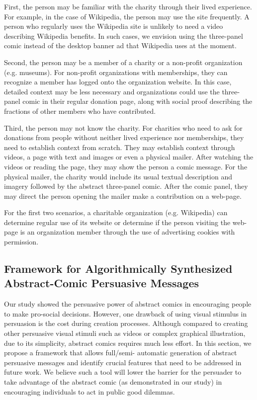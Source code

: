 \begin{description} [leftmargin=\parindent,topsep=0pt,partopsep=3pt,parsep=0pt,itemsep=3pt, listparindent=\parindent]
    First, the person may be familiar with the charity through their lived experience. For example, in the case of Wikipedia, the person may use the site frequently. A person who regularly uses the Wikipedia site is unlikely to need a video describing Wikipedia benefits. In such cases, we envision using the three-panel comic instead of the desktop banner ad that Wikipedia uses at the moment.
    
    Second, the person may be a member of a charity or a non-profit organization (e.g. museums). For non-profit organizations with memberships, they can recognize a member has logged onto the organization website. In this case, detailed context may be less necessary and organizations could use the three-panel comic in their regular donation page, along with social proof describing the fractions of other members who have contributed.
    
    Third, the person may not know the charity. For charities who need to ask for donations from people without neither lived experience nor memberships, they need to establish context from scratch. They may establish context through videos, a page with text and images or even a physical mailer. After watching the videos or reading the page, they may show the person a comic message. For the physical mailer, the charity would include its usual textual description and imagery followed by the abstract three-panel comic. After the comic panel, they may direct the person opening the mailer make a contribution on a web-page.
    
    For the first two scenarios, a charitable organization (e.g. Wikipedia) can determine regular use of its website or determine if the person visiting the web-page is an organization member through the use of advertising cookies with permission.

\end{description}

 \subsection{Framework for Algorithmically Synthesized Abstract-Comic Persuasive Messages}
 \label{sub:framework}
 
Our study showed the persuasive power of abstract comics in encouraging people to make pro-social decisions. However, one drawback of using visual stimulus in persuasion is the cost during creation processes. Although compared to creating other persuasive visual stimuli such as videos or complex graphical illustration, due to its simplicity, abstract comics requires much less effort. In this section, we propose a framework that allows full/semi- automatic generation of abstract persuasive messages and identify crucial features that need to be addressed in future work. We believe such a tool will lower the barrier for the persuader to take advantage of the abstract comic (as demonstrated in our study) in encouraging individuals to act in public good dilemmas.

